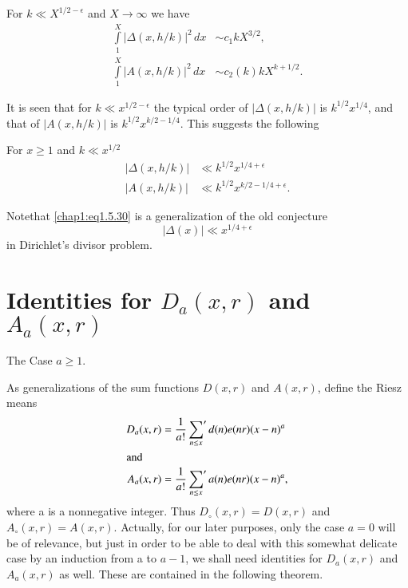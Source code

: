 \begin{Coro*}
For $k\ll X^{1/2-\epsilon}$ and $X\to\infty$ we have
\begin{align}
\int\limits_1^X|\Delta(x,h/k)|^2\,dx &\sim
c_1kX^{3/2},\label{chap1:eq1.5.28}\\
\int\limits_1^X|A(x,h/k)|^2\,dx &\sim c_2(k)
kX^{k+1/2}.\label{chap1:eq1.5.29} 
\end{align}

It is seen that for $k\ll x^{1/2-\epsilon}$ the typical order of
$|\Delta(x,h/k)|$ is $k^{1/2}x^{1/4}$, and that of $|A(x,h/k)|$ is
$k^{1/2}x^{k/2-1/4}$. This suggests the following 
\end{Coro*}

\begin{conjecture*}
For $x\geq 1$ and $k\ll x^{1/2}$
\begin{align}
|\Delta(x,h/k)| &\ll k^{1/2}x^{1/4+\epsilon}\label{chap1:eq1.5.30}\\
|A(x,h/k)| &\ll k^{1/2}x^{k/2-1/4+\epsilon}.\label{chap1:eq1.5.31}
\end{align}
\end{conjecture*}

Note\pageoriginale that \eqref{chap1:eq1.5.30} is a generalization of
the old conjecture 
$$
|\Delta(x)|\ll x^{1/4+\epsilon}
$$
in Dirichlet's divisor problem.

\section{Identities for $D_a(x,r)$ and $A_a(x,r)$}\label{chap1:sec1.6}
The Case $a\geq 1$.

As generalizations of the sum functions $D(x,r)$ and $A(x,r)$, define
the Riesz means
\begin{align}
D_a(x,r) &= \frac{1}{a!}\sideset{}{'}\sum\limits_{n\leq x} d(n)e(nr)
(x-n)^a\label{chap1:eq1.6.1}\\
\intertext{and}
A_a(x,r) &= \frac{1}{a!}\sideset{}{'}\sum\limits_{n\leq x}a(n)e(nr)
(x-n)^a,\label{chap1:eq1.6.2} 
\end{align}
where a is a nonnegative integer. Thus $D_\circ(x,r)=D(x,r)$ and
$A_\circ(x,r)=A(x,r)$. Actually, for our later purposes, only the case
$a=0$ will be of relevance, but just in order to be able to deal with
this somewhat delicate case by an induction from a to $a-1$, we shall
need identities for $D_a(x,r)$ and $A_a(x,r)$ as well. These are
contained in the following theorem.

